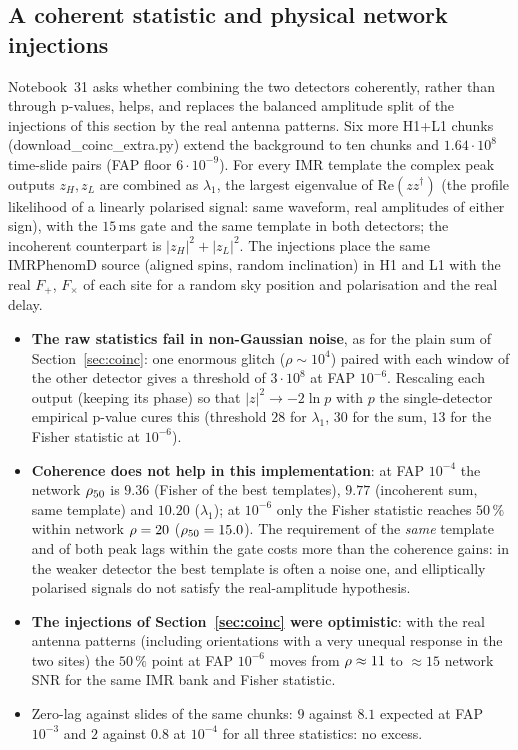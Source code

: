 \subsection{A coherent statistic and physical network injections}\label{sec:coherent}
Notebook~31 asks whether combining the two detectors coherently, rather than through p-values, helps, and replaces the balanced amplitude split of the injections of this section by the real antenna patterns. Six more H1+L1 chunks (download\_coinc\_extra.py) extend the background to ten chunks and $1.64\cdot10^{8}$ time-slide pairs (FAP floor $6\cdot10^{-9}$). For every IMR template the complex peak outputs $z_H,z_L$ are combined as $\lambda_1$, the largest eigenvalue of $\mathrm{Re}(zz^\dagger)$ (the profile likelihood of a linearly polarised signal: same waveform, real amplitudes of either sign), with the $15\,$ms gate and the same template in both detectors; the incoherent counterpart is $|z_H|^2+|z_L|^2$. The injections place the same IMRPhenomD source (aligned spins, random inclination) in H1 and L1 with the real $F_+$, $F_\times$ of each site for a random sky position and polarisation and the real delay.
\begin{itemize}[nosep]
\item \textbf{The raw statistics fail in non-Gaussian noise}, as for the plain sum of Section~\ref{sec:coinc}: one enormous glitch ($\rho\sim10^4$) paired with each window of the other detector gives a threshold of $3\cdot10^{8}$ at FAP $10^{-6}$. Rescaling each output (keeping its phase) so that $|z|^2\to-2\ln p$ with $p$ the single-detector empirical p-value cures this (threshold $28$ for $\lambda_1$, $30$ for the sum, $13$ for the Fisher statistic at $10^{-6}$).
\item \textbf{Coherence does not help in this implementation}: at FAP $10^{-4}$ the network $\rho_{50}$ is $9.36$ (Fisher of the best templates), $9.77$ (incoherent sum, same template) and $10.20$ ($\lambda_1$); at $10^{-6}$ only the Fisher statistic reaches $50\,\%$ within network $\rho=20$ ($\rho_{50}=15.0$). The requirement of the \emph{same} template and of both peak lags within the gate costs more than the coherence gains: in the weaker detector the best template is often a noise one, and elliptically polarised signals do not satisfy the real-amplitude hypothesis.
\item \textbf{The injections of Section~\ref{sec:coinc} were optimistic}: with the real antenna patterns (including orientations with a very unequal response in the two sites) the $50\,\%$ point at FAP $10^{-6}$ moves from $\rho\approx11$ to $\approx15$ network SNR for the same IMR bank and Fisher statistic.
\item Zero-lag against slides of the same chunks: $9$ against $8.1$ expected at FAP $10^{-3}$ and $2$ against $0.8$ at $10^{-4}$ for all three statistics: no excess.
\end{itemize}
